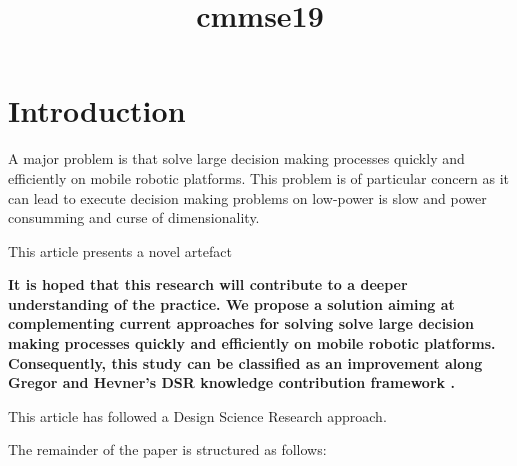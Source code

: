 \documentclass{article}
\title{cmmse19}
\author{}
\begin{document}
\maketitle
      

\section{Introduction}


    
A major problem is that solve large decision making  processes quickly and efficiently on mobile robotic platforms. This problem is of particular concern as it can lead to execute decision making problems on low-power is slow and power consumming and curse of dimensionality. 
    

    

    
This article presents a novel artefact
    

    
\textbf{
It is hoped that this research will contribute to a deeper understanding of the practice. We propose a solution aiming at complementing current approaches for solving solve large decision making  processes quickly and efficiently on mobile robotic platforms. Consequently, this study can be classified as an improvement along Gregor and Hevner’s DSR knowledge contribution framework \cite{Gregor2013}.
}
      
This article has followed a Design Science Research approach.

The remainder of the paper is structured as follows: 

    
      


\end{document}
